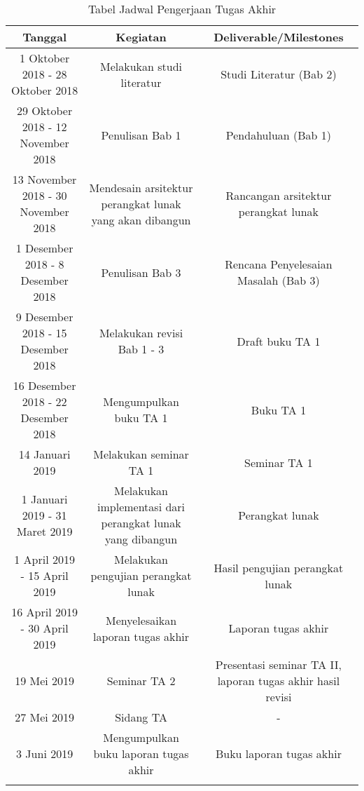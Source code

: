 \begin{center}
	\begin{longtable}{|c|c|c|}
		\hline
		Tanggal & Kegiatan & Deliverable/Milestones \\ \hline
		1 Oktober 2018 - 28 Oktober 2018 & Melakukan studi literatur & Studi Literatur (Bab 2) \\ \hline
		29 Oktober 2018 - 12 November 2018 & Penulisan Bab 1 & Pendahuluan (Bab 1) \\ \hline
		13 November 2018 - 30 November 2018 & Mendesain arsitektur perangkat lunak yang akan dibangun & Rancangan arsitektur perangkat lunak \\ \hline
		1 Desember 2018 - 8 Desember 2018 & Penulisan Bab 3 & Rencana Penyelesaian Masalah (Bab 3) \\ \hline
		9 Desember 2018 - 15 Desember 2018 & Melakukan revisi Bab 1 - 3 & Draft buku TA 1 \\ \hline
		16 Desember 2018 - 22 Desember 2018 & Mengumpulkan buku TA 1 & Buku TA 1 \\ \hline
		14 Januari 2019 & Melakukan seminar TA 1 & Seminar TA 1 \\ \hline
		1 Januari 2019 - 31 Maret 2019 & Melakukan implementasi dari perangkat lunak yang dibangun & Perangkat lunak \\ \hline
		1 April 2019 - 15 April 2019 & Melakukan pengujian perangkat lunak & Hasil pengujian perangkat lunak \\ \hline
		16 April 2019 - 30 April 2019 & Menyelesaikan laporan tugas akhir & Laporan tugas akhir \\ \hline
		19 Mei 2019 & Seminar TA 2 & Presentasi seminar TA II, laporan tugas akhir hasil revisi \\ \hline
		27 Mei 2019 & Sidang TA & - \\ \hline
		3 Juni 2019 & Mengumpulkan buku laporan tugas akhir & Buku laporan tugas akhir \\
		\hline
		\caption{Tabel Jadwal Pengerjaan Tugas Akhir}
		\label{tab:final-project-schedule}
	\end{longtable}
\end{center}
